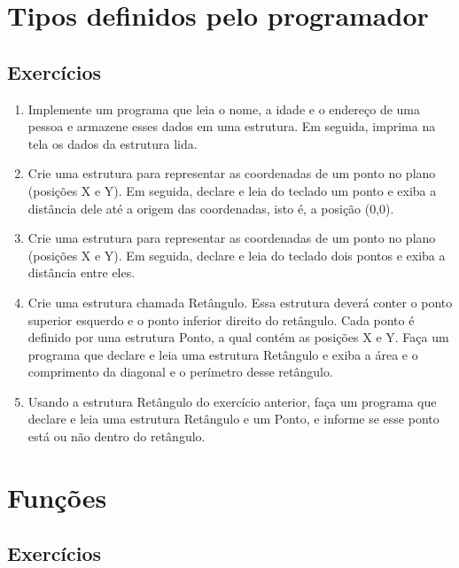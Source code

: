 \documentclass[a4paper,10pt]{article}
\begin{document}
\begin{multicols*}{2}
\section{Tipos definidos pelo programador}

\setcounter{subsection}{4}
\subsection{Exercícios}

\setlength{\leftmargini}{0pt}
\begin{enumerate}
  \item Implemente um programa que leia o nome, a idade e o endereço de uma pessoa e armazene esses dados em uma estrutura. Em seguida, imprima na tela os dados da estrutura lida.
  \item Crie uma estrutura para representar as coordenadas de um ponto no plano (posições X e Y). Em seguida, declare e leia do teclado um ponto e exiba a distância dele até a origem das coordenadas, isto é, a posição (0,0).
  \item Crie uma estrutura para representar as coordenadas de um ponto no plano (posições X e Y). Em seguida, declare e leia do teclado dois pontos e exiba a distância entre eles.
  \item Crie uma estrutura chamada Retângulo. Essa estrutura deverá conter o ponto superior esquerdo e o ponto inferior direito do retângulo. Cada ponto é definido por uma estrutura Ponto, a qual contém as posições X e Y. Faça um programa que declare e leia uma estrutura Retângulo e exiba a área e o comprimento da diagonal e o perímetro desse retângulo.
  \item Usando a estrutura Retângulo do exercício anterior, faça um programa que declare e leia uma estrutura Retângulo e um Ponto, e informe se esse ponto está ou não dentro do retângulo.
\end{enumerate}

\vfill\null
\pagebreak
\vspace*{0.0cm}

\section{Funções}

\setcounter{subsection}{3}
\subsection{Exercícios}


\end{multicols*}
\end{document}
